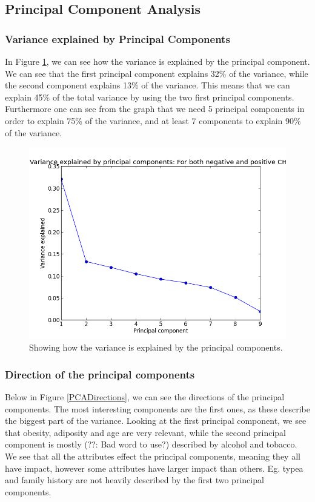 \subsection{Principal Component Analysis}

\subsubsection{Variance explained by Principal Components}

In Figure \ref{VariancePCA}, we can see how the variance is explained by the principal component. We can see that the first principal component explains 32\% of the variance, while the second component explains 13\% of the variance. This means that we can explain 45\% of the total variance by using the two first principal components. Furthermore one can see from the graph that we need 5 principal components in order to explain 75\% of the variance, and at least 7 components to explain 90\% of the variance.

\begin{figure}[H]
\includegraphics[scale=0.75]{pictures/PCAPosAndNeg.png}
\caption{Showing how the variance is explained by the principal components.}
\label{VariancePCA}
\end{figure}

\subsubsection{Direction of the principal components}

Below in Figure \ref{PCADirections}, we can see the directions of the principal components. The most interesting components are the first ones, as these describe the biggest part of the variance. Looking at the first principal component, we see that obesity, adiposity and age are very relevant, while the second principal component is mostly (??: Bad word to use?) described by alcohol and tobacco. We see that all the attributes effect the principal components, meaning they all have impact, however some attributes have larger impact than others. Eg. typea and family history are not heavily described by the first two principal components.


